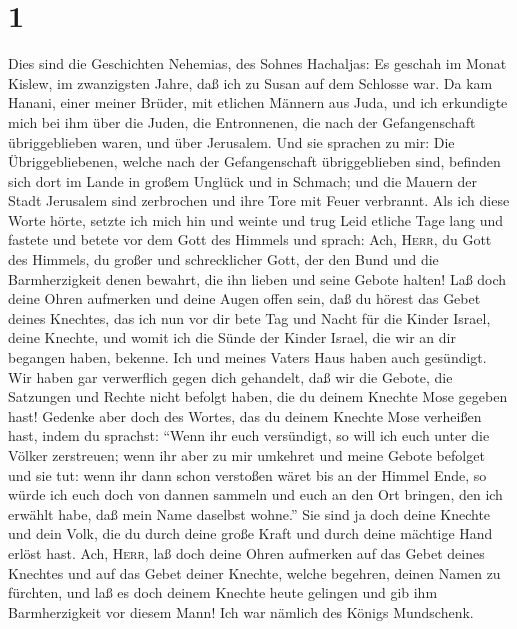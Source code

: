 \hypertarget{section}{%
\section{1}\label{section}}

 Dies sind die Geschichten Nehemias, des Sohnes Hachaljas:
Es geschah im Monat Kislew, im zwanzigsten Jahre, daß ich zu Susan auf
dem Schlosse war.  Da kam Hanani, einer meiner Brüder, mit
etlichen Männern aus Juda, und ich erkundigte mich bei ihm über die
Juden, die Entronnenen, die nach der Gefangenschaft übriggeblieben
waren, und über Jerusalem.  Und sie sprachen zu mir: Die
Übriggebliebenen, welche nach der Gefangenschaft übriggeblieben sind,
befinden sich dort im Lande in großem Unglück und in Schmach; und die
Mauern der Stadt Jerusalem sind zerbrochen und ihre Tore mit Feuer
verbrannt.  Als ich diese Worte hörte, setzte ich mich hin
und weinte und trug Leid etliche Tage lang und fastete und betete vor
dem Gott des Himmels und sprach:  Ach, \textsc{Herr}, du
Gott des Himmels, du großer und schrecklicher Gott, der den Bund und die
Barmherzigkeit denen bewahrt, die ihn lieben und seine Gebote halten!
 Laß doch deine Ohren aufmerken und deine Augen offen
sein, daß du hörest das Gebet deines Knechtes, das ich nun vor dir bete
Tag und Nacht für die Kinder Israel, deine Knechte, und womit ich die
Sünde der Kinder Israel, die wir an dir begangen haben, bekenne. Ich und
meines Vaters Haus haben auch gesündigt.  Wir haben gar
verwerflich gegen dich gehandelt, daß wir die Gebote, die Satzungen und
Rechte nicht befolgt haben, die du deinem Knechte Mose gegeben hast!
 Gedenke aber doch des Wortes, das du deinem Knechte Mose
verheißen hast, indem du sprachst: ``Wenn ihr euch versündigt, so will
ich euch unter die Völker zerstreuen;  wenn ihr aber zu
mir umkehret und meine Gebote befolget und sie tut: wenn ihr dann schon
verstoßen wäret bis an der Himmel Ende, so würde ich euch doch von
dannen sammeln und euch an den Ort bringen, den ich erwählt habe, daß
mein Name daselbst wohne.''  Sie sind ja doch deine
Knechte und dein Volk, die du durch deine große Kraft und durch deine
mächtige Hand erlöst hast.  Ach, \textsc{Herr}, laß doch
deine Ohren aufmerken auf das Gebet deines Knechtes und auf das Gebet
deiner Knechte, welche begehren, deinen Namen zu fürchten, und laß es
doch deinem Knechte heute gelingen und gib ihm Barmherzigkeit vor diesem
Mann! Ich war nämlich des Königs Mundschenk.

